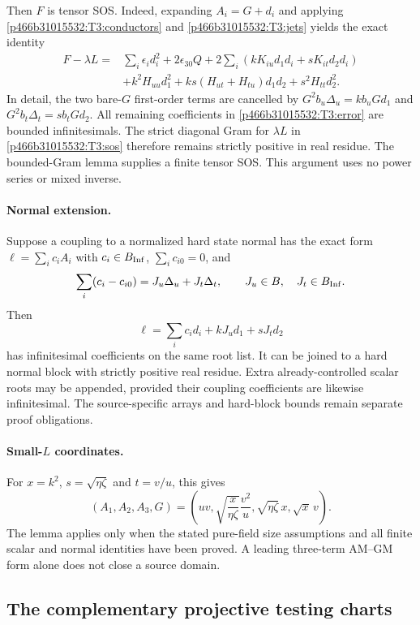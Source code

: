 Then $F$ is tensor SOS. Indeed, expanding $A_i=G+d_i$ and applying
\eqref{p466b31015532:T3:conductors} and \eqref{p466b31015532:T3:jets} yields the exact identity
\begin{align}\label{p466b31015532:T3:error}
 F-\lambda L={}&\sum_i\epsilon_i d_i^2+2\epsilon_{30}Q
 +2\sum_i(kK_{iu}d_1d_i+sK_{it}d_2d_i)\\
 &+k^2H_{uu}d_1^2+ks(H_{ut}+H_{tu})d_1d_2
          +s^2H_{tt}d_2^2.\nonumber
\end{align}
In detail, the two bare-$G$ first-order terms are cancelled by
$G^2b_u\Delta_u=kb_uGd_1$ and
$G^2b_t\Delta_t=sb_tGd_2$. All remaining coefficients in
\eqref{p466b31015532:T3:error} are bounded infinitesimals. The strict diagonal
Gram for $\lambda L$ in \eqref{p466b31015532:T3:sos} therefore remains strictly
positive in real residue. The bounded-Gram lemma supplies a finite
tensor SOS. This argument uses no power series or mixed inverse.

\paragraph{Normal extension.}
Suppose a coupling to a normalized hard state normal has the exact form
$\ell=\sum_i c_iA_i$ with $c_i\in B_{\rm Inf}$,
$\sum_i c_{i0}=0$, and
\[
 \sum_i(c_i-c_{i0})=J_u\Delta_u+J_t\Delta_t,
 \qquad J_u\in B,\quad J_t\in B_{\rm Inf}.
\]
Then
\[
 \ell=\sum_i c_i d_i+kJ_u d_1+sJ_t d_2
\]
has infinitesimal coefficients on the same root list. It can be joined
to a hard normal block with strictly positive real residue. Extra
already-controlled scalar roots may be appended, provided their
coupling coefficients are likewise infinitesimal. The source-specific
arrays and hard-block bounds remain separate proof obligations.

\paragraph{Small-$L$ coordinates.}
For $x=k^2$, $s=\sqrt{\eta\zeta}$ and $t=v/u$, this gives
\[
 (A_1,A_2,A_3,G)=
 \left(uv,\sqrt{\frac{x}{\eta\zeta}}\frac{v^2}{u},
       \sqrt{\eta\zeta}\,x,\sqrt{x}\,v\right).
\]
The lemma applies only when the stated pure-field size assumptions and
all finite scalar and normal identities have been proved. A leading
three-term AM--GM form alone does not close a source domain.



\subsection{The complementary projective testing charts}

